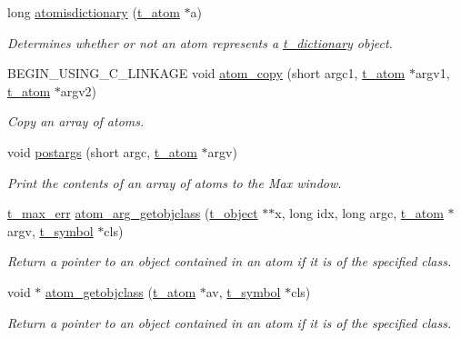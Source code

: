 \begin{DoxyCompactItemize}
long \hyperlink{group__atom_ga85a30af9d861ac3f5664e63c4772e77b}{atomisdictionary} (\hyperlink{structt__atom}{t\_\-atom} $\ast$a)
\begin{DoxyCompactList}\small\item\em Determines whether or not an atom represents a \hyperlink{structt__dictionary}{t\_\-dictionary} object. \item\end{DoxyCompactList}\item 
BEGIN\_\-USING\_\-C\_\-LINKAGE void \hyperlink{group__atom_ga34f9b920bed69c19988fe70d7be79c18}{atom\_\-copy} (short argc1, \hyperlink{structt__atom}{t\_\-atom} $\ast$argv1, \hyperlink{structt__atom}{t\_\-atom} $\ast$argv2)
\begin{DoxyCompactList}\small\item\em Copy an array of atoms. \item\end{DoxyCompactList}\item 
void \hyperlink{group__atom_ga827d5fa3550123db43e1121fea79db1b}{postargs} (short argc, \hyperlink{structt__atom}{t\_\-atom} $\ast$argv)
\begin{DoxyCompactList}\small\item\em Print the contents of an array of atoms to the Max window. \item\end{DoxyCompactList}\item 
\hyperlink{group__datatypes_ga73edaae82b318855cc09fac994918165}{t\_\-max\_\-err} \hyperlink{group__atom_ga2c50571450b200933f47ad6c7c411388}{atom\_\-arg\_\-getobjclass} (\hyperlink{structt__object}{t\_\-object} $\ast$$\ast$x, long idx, long argc, \hyperlink{structt__atom}{t\_\-atom} $\ast$argv, \hyperlink{structt__symbol}{t\_\-symbol} $\ast$cls)
\begin{DoxyCompactList}\small\item\em Return a pointer to an object contained in an atom if it is of the specified class. \item\end{DoxyCompactList}\item 
void $\ast$ \hyperlink{group__atom_ga10405190b0d5dbec546086aec6634c9d}{atom\_\-getobjclass} (\hyperlink{structt__atom}{t\_\-atom} $\ast$av, \hyperlink{structt__symbol}{t\_\-symbol} $\ast$cls)
\begin{DoxyCompactList}\small\item\em Return a pointer to an object contained in an atom if it is of the specified class. \item\end{DoxyCompactList}\end{DoxyCompactItemize}


